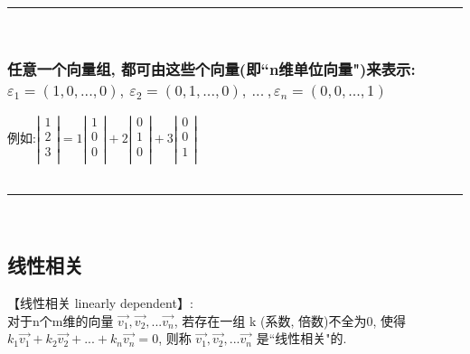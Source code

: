 \documentclass[UTF8]{ctexart}
\begin{document}
~\\
\hrule
~\\

\subsubsection{任意一个向量组, 都可由这些个向量(即``n维单位向量")来表示: $\varepsilon _1=\left( 1,0,...,0 \right) ,\ \varepsilon _2=\left( 0,1,...,0 \right) ,\ ...\ ,\varepsilon _n=\left( 0,0,...,1 \right) $}

例如:$
	\left| \begin{array}{c}
		1 \\
		2 \\
		3 \\
	\end{array} \right|=1\left| \begin{array}{c}
		1 \\
		0 \\
		0 \\
	\end{array} \right|+2\left| \begin{array}{c}
		0 \\
		1 \\
		0 \\
	\end{array} \right|+3\left| \begin{array}{c}
		0 \\
		0 \\
		1 \\
	\end{array} \right|
$\\

~\\
\hrule
~\\

\subsection{线性相关}

【线性相关 linearly dependent】: \\
对于n个m维的向量 $ \vec{v_1},  \vec{v_2}, ...  \vec{v_n}$, 若存在一组 k (系数, 倍数)不全为0, 使得 $ k_1  \vec{v_1} + k_2  \vec{v_2} + ... + k_n  \vec{v_n} = 0 $, 则称 $ \vec{v_1},  \vec{v_2}, ...  \vec{v_n}$ 是``线性相关"的.\\
\end{document}
